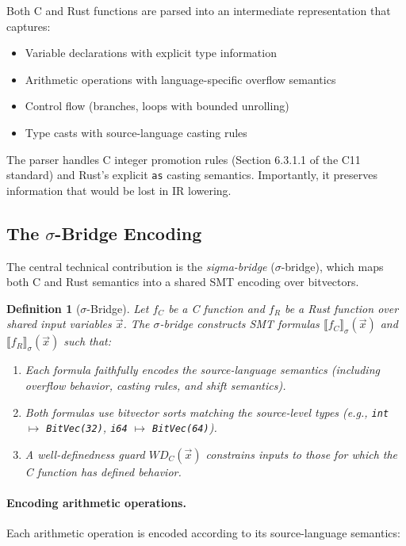 \documentclass[10pt,letterpaper]{article}
\newtheorem{definition}[theorem]{Definition}
\begin{document}
Both C and Rust functions are parsed into an intermediate representation that captures:
\begin{itemize}[itemsep=1pt]
\item Variable declarations with explicit type information
\item Arithmetic operations with language-specific overflow semantics
\item Control flow (branches, loops with bounded unrolling)
\item Type casts with source-language casting rules
\end{itemize}

The parser handles C integer promotion rules (Section 6.3.1.1 of the C11 standard) and
Rust's explicit \texttt{as} casting semantics. Importantly, it preserves information
that would be lost in IR lowering.

\subsection{The \texorpdfstring{$\sigma$}{Sigma}-Bridge Encoding}
\label{sec:sigma}

The central technical contribution is the \emph{sigma-bridge} ($\sigma$-bridge),
which maps both C and Rust semantics into a shared SMT encoding over bitvectors.

\begin{definition}[$\sigma$-Bridge]
\label{def:sigma}
Let $f_C$ be a C function and $f_R$ be a Rust function over shared input variables
$\vec{x}$. The $\sigma$-bridge constructs SMT formulas
$\llbracket f_C \rrbracket_\sigma(\vec{x})$ and
$\llbracket f_R \rrbracket_\sigma(\vec{x})$ such that:
\begin{enumerate}[itemsep=1pt]
\item Each formula faithfully encodes the source-language semantics (including
  overflow behavior, casting rules, and shift semantics).
\item Both formulas use bitvector sorts matching the source-level types (e.g.,
  \texttt{int} $\mapsto$ \texttt{BitVec(32)}, \texttt{i64} $\mapsto$ \texttt{BitVec(64)}).
\item A \emph{well-definedness guard} $\mathit{WD}_C(\vec{x})$ constrains inputs to
  those for which the C function has defined behavior.
\end{enumerate}
\end{definition}

\paragraph{Encoding arithmetic operations.}
Each arithmetic operation is encoded according to its source-language semantics:
\end{document}
